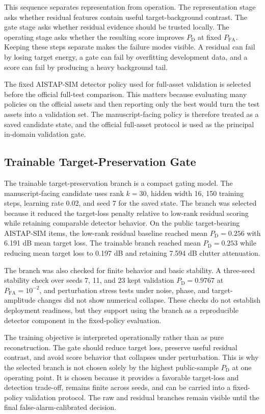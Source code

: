 \documentclass[journal]{IEEEtran}
\begin{document}
This sequence separates representation from operation. The representation stage asks whether residual features contain useful target-background contrast. The gate stage asks whether residual evidence should be trusted locally. The operating stage asks whether the resulting score improves $P_{\mathrm{D}}$ at fixed $P_{\mathrm{FA}}$. Keeping these steps separate makes the failure modes visible. A residual can fail by losing target energy, a gate can fail by overfitting development data, and a score can fail by producing a heavy background tail.

The fixed AISTAP-SIM detector policy used for full-asset validation is selected before the official full-test comparison. This matters because evaluating many policies on the official assets and then reporting only the best would turn the test assets into a validation set. The manuscript-facing policy is therefore treated as a saved candidate state, and the official full-asset protocol is used as the principal in-domain validation gate.

\subsection{Trainable Target-Preservation Gate}

The trainable target-preservation branch is a compact gating model. The manuscript-facing candidate uses rank $k=30$, hidden width 16, 150 training steps, learning rate 0.02, and seed 7 for the saved state. The branch was selected because it reduced the target-loss penalty relative to low-rank residual scoring while retaining comparable detector behavior. On the public target-bearing AISTAP-SIM items, the low-rank residual baseline reached mean $P_{\mathrm{D}}=0.256$ with 6.191 dB mean target loss. The trainable branch reached mean $P_{\mathrm{D}}=0.253$ while reducing mean target loss to 0.197 dB and retaining 7.594 dB clutter attenuation.

The branch was also checked for finite behavior and basic stability. A three-seed stability check over seeds 7, 11, and 23 kept validation $P_{\mathrm{D}}=0.9767$ at $P_{\mathrm{FA}}=10^{-2}$, and perturbation stress tests under noise, phase, and target-amplitude changes did not show numerical collapse. These checks do not establish deployment readiness, but they support using the branch as a reproducible detector component in the fixed-policy evaluation.

The training objective is interpreted operationally rather than as pure reconstruction. The gate should reduce target loss, preserve useful residual contrast, and avoid score behavior that collapses under perturbation. This is why the selected branch is not chosen solely by the highest public-sample $P_{\mathrm{D}}$ at one operating point. It is chosen because it provides a favorable target-loss and detection trade-off, remains finite across seeds, and can be carried into a fixed-policy validation protocol. The raw and residual branches remain visible until the final false-alarm-calibrated decision.
\end{document}
